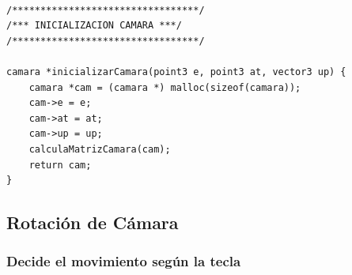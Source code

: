 \documentclass[12pt,a4paper]{article}
\begin{document}
\begin{lstlisting}

/*********************************/
/*** INICIALIZACION CAMARA ***/
/*********************************/

camara *inicializarCamara(point3 e, point3 at, vector3 up) {
    camara *cam = (camara *) malloc(sizeof(camara));
    cam->e = e;
    cam->at = at;
    cam->up = up;
    calculaMatrizCamara(cam);
    return cam;
}

\end{lstlisting}

\newpage
\subsection{Rotación de Cámara}

\subsubsection{Decide el movimiento según la tecla}
\end{document}
